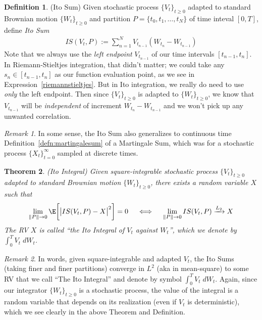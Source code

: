 \documentclass[12pt]{article}
\theoremstyle{plain}
\newtheorem{thm}{Theorem}[section]
\theoremstyle{definition}
\newtheorem{defn}[thm]{Definition}
\theoremstyle{remark}
\newtheorem*{rmk}{Remark}
\newcommand{\Lqto}[1]{\xrightarrow{L_{#1}}}
\newcommand{\sumnN}{\sum^N_{n=1}}
\newcommand{\tinfz}{_{t=0}^\infty}
\begin{document}
\clearpage
\begin{defn}(Ito Sum)
Given stochastic process $\{V_t\}_{t\geq 0}$ adapted to standard
Brownian motion $\{W_t\}_{t\geq 0}$ and partition $P = \{t_0,
t_1,\ldots,t_N\}$ of time inteval $[0,T]$, define
\emph{Ito Sum}
\begin{align*}
  IS(V_t,P):=\sumnN V_{t_{n-1}} (W_{t_n}-W_{t_{n-1}})
\end{align*}
Note that we always use the \emph{left endpoint} $V_{t_{n-1}}$ of our
time intervals $[t_{n-1},t_n]$. In Riemann-Stieltjes integration, that
didn't matter; we could take any $s_n\in[t_{n-1},t_n]$ as our function
evaluation point, as we see in Expression~\ref{riemannstieltjes}. But in
Ito integration, we really do need to use \emph{only} the left endpoint.
Then since $\{V_t\}_{t\geq 0}$ is adapted to $\{W_t\}_{t\geq 0}$, we
know that $V_{t_{n-1}}$ will be \emph{independent} of increment
$W_{t_n}-W_{t_{n-1}}$ and we won't pick up any unwanted correlation.
\end{defn}

\begin{rmk}
In some sense, the Ito Sum also generalizes to continuous time
Definition~\ref{defn:martingalesum} of a Martingale Sum, which was for a
stochastic process $\{X_t\}\tinfz$ sampled at discrete times.
\end{rmk}


\begin{thm}\emph{(Ito Integral)}
Given square-integrable stochastic process $\{V_t\}_{t\geq 0}$ adapted
to standard Brownian motion $\{W_t\}_{t\geq 0}$, there exists a random
variable $X$ such that
\begin{align*}
  \lim_{\lVert P\rVert \rightarrow 0}
  \E
  \bigg[
  \big\lvert
  IS(V_t,P)
  - X
  \big\rvert^2
  \bigg]
  = 0
  \quad\iff\quad
  \lim_{\lVert P\rVert \rightarrow 0}
  IS(V_t,P)
  \Lqto{2}
  X
\end{align*}
The RV $X$ is called ``the Ito Integral of $V_t$ against $W_t$'', which
we denote by $\int_0^T V_t \;dW_t$.
\end{thm}

\begin{rmk}
In words, given square-integrable and adapted $V_t$, the Ito Sums
(taking finer and finer partitions) converge in $L^2$ (aka in
mean-square) to some RV that we call ``The Ito Integral'' and denote by
symbol $\int_0^T V_t \;dW_t$.  Again, since our integrator
$\{W_t\}_{t\geq 0}$ is a stochastic process, the value of the integral
is a random variable that depends on its realization (even if $V_t$ is
deterministic), which we see clearly in the above Theorem and
Definition.
\end{rmk}
\end{document}
